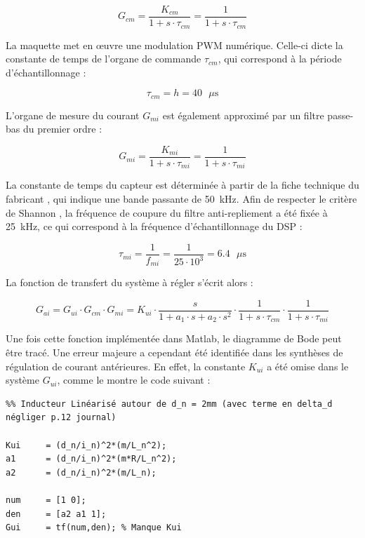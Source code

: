 \begin{equation}
    G_{cm} = \frac{K_{cm}}{1+s \cdot\tau_{cm}} = \frac{1}{1+s \cdot\tau_{cm}}
\end{equation}

La maquette met en œuvre une modulation PWM numérique. Celle-ci dicte la constante de temps de l'organe de commande $\tau_{cm}$, qui correspond à la période d'échantillonnage :

\begin{equation}
    \tau_{cm} = h = 40 \text{ $\mu$s}
\end{equation}

L'organe de mesure du courant $G_{mi}$ est également approximé par un filtre passe-bas du premier ordre :

\begin{equation}
    G_{mi} = \frac{K_{mi}}{1+s \cdot\tau_{mi}} = \frac{1}{1+s \cdot\tau_{mi}}
\end{equation}

La constante de temps du capteur est déterminée à partir de la fiche technique du fabricant \cite{CaptCour}, qui indique une bande passante de 50~kHz. Afin de respecter le critère de Shannon \cite{Shanon}, la fréquence de coupure du filtre anti-repliement a été fixée à 25~kHz, ce qui correspond à la fréquence d'échantillonnage du DSP :

\begin{equation}
    \tau_{mi} = \frac{1}{f_{mi}} = \frac{1}{25\cdot 10^3} = 6.4 \text{ $\mu$s}
\end{equation}

La fonction de transfert du système à régler s'écrit alors :

\begin{equation}
    G_{ai} = G_{ui} \cdot G_{cm} \cdot G_{mi} = K_{ui}\cdot\frac{s}{1 + a_1 \cdot s + a_2\cdot s^2} \cdot \frac{1}{1+s \cdot\tau_{cm}} \cdot \frac{1}{1+s \cdot\tau_{mi}}
\end{equation}

Une fois cette fonction implémentée dans Matlab, le diagramme de Bode peut être tracé. Une erreur majeure a cependant été identifiée dans les synthèses de régulation de courant antérieures. En effet, la constante $K_{ui}$ a été omise dans le système $G_{ui}$, comme le montre le code suivant :

\begin{verbatim}
%% Inducteur Linéarisé autour de d_n = 2mm (avec terme en delta_d négliger p.12 journal)

Kui     = (d_n/i_n)^2*(m/L_n^2);
a1      = (d_n/i_n)^2*(m*R/L_n^2);
a2      = (d_n/i_n)^2*(m/L_n);

num     = [1 0];
den     = [a2 a1 1];
Gui     = tf(num,den); % Manque Kui
\end{verbatim}

